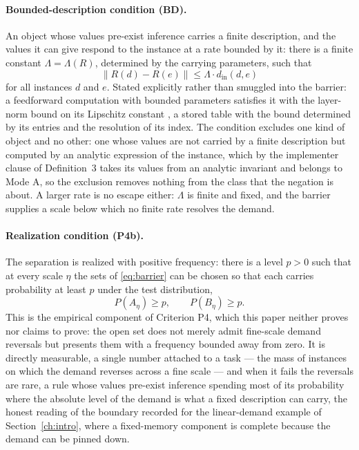 \paragraph{Bounded-description condition (BD).} An object whose values pre-exist inference carries a finite description, and the values it can give respond to the instance at a rate bounded by it: there is a finite constant $\Lambda = \Lambda (R)$, determined by the carrying parameters, such that
\begin{equation}
\| R(d) - R(e) \| \le \Lambda \cdot d_{\mathrm{in}} (d, e)
\label{eq:rate}
\end{equation}
for all instances $d$ and $e$. Stated explicitly rather than smuggled into the barrier: a feedforward computation with bounded parameters satisfies it with the layer-norm bound on its Lipschitz constant \citep{virmaux2018}, a stored table with the bound determined by its entries and the resolution of its index. The condition excludes one kind of object and no other: one whose values are not carried by a finite description but computed by an analytic expression of the instance, which by the implementer clause of Definition~3 takes its values from an analytic invariant and belongs to Mode A, so the exclusion removes nothing from the class that the negation is about. A larger rate is no escape either: $\Lambda$ is finite and fixed, and the barrier supplies a scale below which no finite rate resolves the demand.

\paragraph{Realization condition (P4b).} The separation is realized with positive frequency: there is a level $p > 0$ such that at every scale $\eta$ the sets of \eqref{eq:barrier} can be chosen so that each carries probability at least $p$ under the test distribution,
\begin{equation}
P (A_\eta ) \ge p , \qquad P (B_\eta ) \ge p .
\label{eq:realization}
\end{equation}
This is the empirical component of Criterion P4, which this paper neither proves nor claims to prove: the open set does not merely admit fine-scale demand reversals but presents them with a frequency bounded away from zero. It is directly measurable, a single number attached to a task --- the mass of instances on which the demand reverses across a fine scale --- and when it fails the reversals are rare, a rule whose values pre-exist inference spending most of its probability where the absolute level of the demand is what a fixed description can carry, the honest reading of the boundary recorded for the linear-demand example of Section~\ref{ch:intro}, where a fixed-memory component is complete because the demand can be pinned down.

